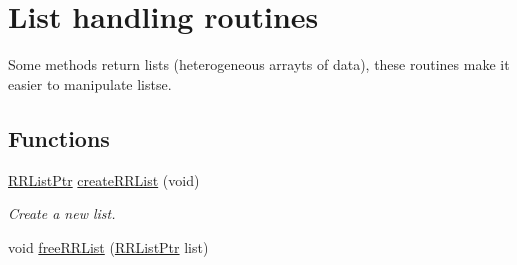 \hypertarget{group__list}{\section{List handling routines}
\label{group__list}
}


Some methods return lists (heterogeneous arrayts of data), these routines make it easier to manipulate listse.  


\subsection*{Functions}
\begin{DoxyCompactItemize}
\item 
\hyperlink{rrc__types_8h_a32a8a60ac06858ff3a791672bd2bec73}{R\-R\-List\-Ptr} \hyperlink{group__list_gab6b39b0c87e8b3c9d416c99223d98bb5}{create\-R\-R\-List} (void)
\begin{DoxyCompactList}\small\item\em Create a new list. \end{DoxyCompactList}\item 
\hypertarget{group__list_ga1382c85efff1e5ef2c45a28321da99a6}{void \hyperlink{group__list_ga1382c85efff1e5ef2c45a28321da99a6}{free\-R\-R\-List} (\hyperlink{rrc__types_8h_a32a8a60ac06858ff3a791672bd2bec73}{R\-R\-List\-Ptr} list)}\label{group__list_ga1382c85efff1e5ef2c45a28321da99a6}


\end{DoxyCompactItemize}
